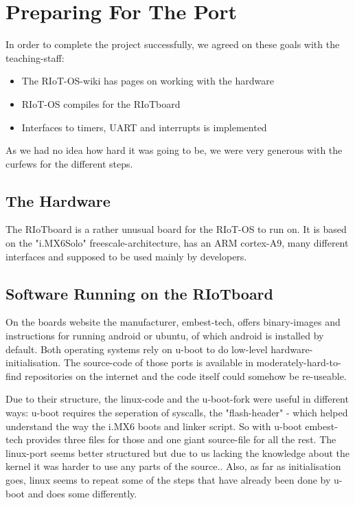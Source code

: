 \section{Preparing For The Port}

In order to complete the project successfully, we agreed on these goals with the
teaching-staff:

\begin{itemize}
\item The RIoT-OS-wiki has pages on working with the hardware
\item RIoT-OS compiles for the RIoTboard
\item Interfaces to timers, UART and interrupts is implemented
\end{itemize}

As we had no idea how hard it was going to be, we were very generous with the curfews
for the different steps.

\subsection{The Hardware}
The RIoTboard is a rather unusual board for the RIoT-OS to run on.
It is based on the "i.MX6Solo" freescale-architecture, has an ARM cortex-A9, many
different interfaces and supposed to be used mainly by developers.


\subsection{Software Running on the RIoTboard}
On the boards website the manufacturer, embest-tech, offers binary-images and instructions
for running android or ubuntu, of which android is installed by default. Both operating
systems rely on u-boot to do low-level hardware-initialisation. The source-code of those
ports is available in moderately-hard-to-find repositories on the internet and
the code itself could somehow be re-useable.

Due to their structure, the linux-code and the u-boot-fork were useful in different ways:
u-boot requires the seperation of syscalls, the "flash-header" - which helped understand
the way the i.MX6 boots and linker script.
So with u-boot embest-tech provides three files for those and one giant source-file for
all the rest.
The linux-port seems better structured but due to us lacking the knowledge about
the kernel it was harder to use any parts of the source..
Also, as far as initialisation goes, linux seems to repeat some of the steps that have
already been done by u-boot and does some differently.

